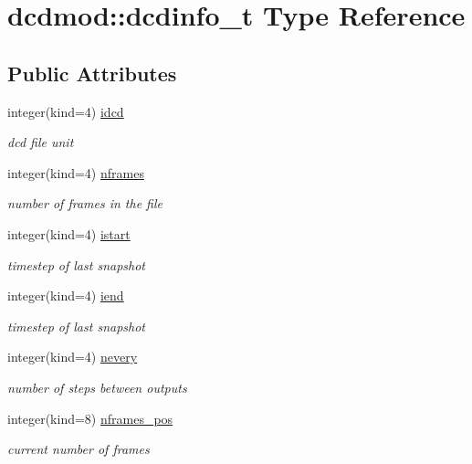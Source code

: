 \hypertarget{structdcdmod_1_1dcdinfo__t}{\section{dcdmod\-:\-:dcdinfo\-\_\-t Type Reference}
\label{structdcdmod_1_1dcdinfo__t}
}
\subsection*{Public Attributes}
\begin{DoxyCompactItemize}
\item 
integer(kind=4) \hyperlink{structdcdmod_1_1dcdinfo__t_ab9f61d86ef4bf3d09888abddaa3c1fd7}{idcd}
\begin{DoxyCompactList}\small\item\em dcd file unit \end{DoxyCompactList}\item 
integer(kind=4) \hyperlink{structdcdmod_1_1dcdinfo__t_a2d3ab18a0c6c096cdf2391597303ed7f}{nframes}
\begin{DoxyCompactList}\small\item\em number of frames in the file \end{DoxyCompactList}\item 
integer(kind=4) \hyperlink{structdcdmod_1_1dcdinfo__t_a6f7b40c99890fd6bfc38a9dde608bec2}{istart}
\begin{DoxyCompactList}\small\item\em timestep of last snapshot \end{DoxyCompactList}\item 
integer(kind=4) \hyperlink{structdcdmod_1_1dcdinfo__t_acf96acb569660c2986d1956f4cc7b1df}{iend}
\begin{DoxyCompactList}\small\item\em timestep of last snapshot \end{DoxyCompactList}\item 
integer(kind=4) \hyperlink{structdcdmod_1_1dcdinfo__t_a6637e3bbb65e0d530e2893bec42a78c1}{nevery}
\begin{DoxyCompactList}\small\item\em number of steps between outputs \end{DoxyCompactList}\item 
integer(kind=8) \hyperlink{structdcdmod_1_1dcdinfo__t_a5ec4a2f171f3cb7b8eec4b8ea8a22411}{nframes\-\_\-pos}
\begin{DoxyCompactList}\small\item\em current number of frames \end{DoxyCompactList}\item 

\end{DoxyCompactItemize}
